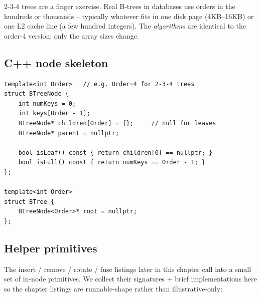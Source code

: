 \documentclass[11pt]{article}
\begin{document}
\begin{ideabox}
2-3-4 trees are a finger exercise. Real B-trees in databases use orders in the hundreds or thousands -- typically whatever fits in one disk page (4KB--16KB) or one L2 cache line (a few hundred integers). The \emph{algorithms} are identical to the order-4 version; only the array sizes change.
\end{ideabox}

\subsection*{C++ node skeleton}

\begin{lstlisting}[basicstyle=\ttfamily\small,frame=single]
template<int Order>   // e.g. Order=4 for 2-3-4 trees
struct BTreeNode {
    int numKeys = 0;
    int keys[Order - 1];
    BTreeNode* children[Order] = {};     // null for leaves
    BTreeNode* parent = nullptr;

    bool isLeaf() const { return children[0] == nullptr; }
    bool isFull() const { return numKeys == Order - 1; }
};

template<int Order>
struct BTree {
    BTreeNode<Order>* root = nullptr;
};
\end{lstlisting}

\subsection*{Helper primitives}

The insert / remove / rotate / fuse listings later in this chapter
call into a small set of in-node primitives. We collect their
signatures + brief implementations here so the chapter listings are
runnable-shape rather than illustrative-only:
\end{document}

